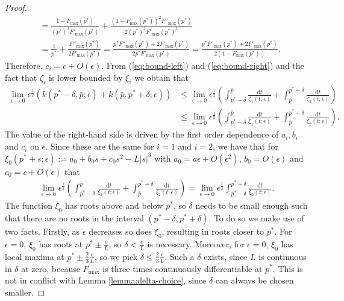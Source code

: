\documentclass[11pt,a4paper]{article}
\numberwithin{equation}{section}
\begin{document}
\begin{proof}
\begin{align*}
        &=\frac{1-F_{\max}(p^*)}{(p^*)^2F'_{\max}\left(p^*\right)}+\frac{(1-F_{\max}(p^*))^2F''_{\max}\left(p^*\right)}{2(p^*)^2F'_{\max}\left(p^*\right)^3}\\
        &=\frac{1}{p^*}+\frac{F''_{\max}\left(p^*\right)}{2F'_{\max}\left(p^*\right)}=\frac{p^*F''_{\max}(p^*)+2F'_{\max}(p^*)}{2p^*F'_{\max}(p^*)}=\frac{p^*F''_{\max}(p^*)+2F'_{\max}(p^*)}{2(1-F_{\max}(p^*))}.
    \end{align*}
    Therefore, $c_i=c+O(\epsilon)$. From (\ref{eq:bound-left}) and (\ref{eq:bound-right}) and the fact that $\zeta_i$ is lower bounded by $\xi_i$ we obtain that
    \begin{align*}
        \lim_{\epsilon\to 0}\epsilon^{\frac{1}{2}}\left(k(p^*-\delta,\bar{p};\epsilon)+k(\bar{p},p^*+\delta;\epsilon)\right)&\le\lim_{\epsilon\to 0}\epsilon^{\frac{1}{2}}\left(\int_{p^*-\delta}^{\bar{p}}\frac{\mathrm{d}t}{\zeta_1(t;\epsilon)}+\int_{\bar{p}}^{p^*+\delta}\frac{\mathrm{d}t}{\zeta_2(t;\epsilon)}\right)\\
        &\le\lim_{\epsilon\to 0}\epsilon^{\frac{1}{2}}\left(\int_{p^*-\delta}^{\bar{p}}\frac{\mathrm{d}t}{\xi_1(t;\epsilon)}+\int^{p^*+\delta}_{\bar{p}}\frac{\mathrm{d}t}{\xi_2(t;\epsilon)}\right).
    \end{align*}
    The value of the right-hand side is driven by the first order dependence of $a_i,b_i$ and $c_i$ on $\epsilon$. Since these are the same for $i=1$ and $i=2$, we have that for $\xi_0(p^*+s;\epsilon):=a_0+b_0s+c_0s^2-L|s|^3$ with $a_0=a\epsilon+O(\epsilon^2)$, $b_0=O(\epsilon)$ and $c_0=c+O(\epsilon)$ that 
    \begin{align}
        \lim_{\epsilon\to 0}\epsilon^{\frac{1}{2}}\left(\int_{p^*-\delta}^{\bar{p}}\frac{\mathrm{d}t}{\xi_1(t;\epsilon)}+\int^{p^*+\delta}_{\bar{p}}\frac{\mathrm{d}t}{\xi_2(t;\epsilon)}\right)=\lim_{\epsilon\to 0}\epsilon^{\frac{1}{2}}\int_{p^*-\delta}^{p^*+\delta}\frac{\mathrm{d}t}{\xi_0(t;\epsilon)}.\label{eq:xi-0}
    \end{align}
    The function $\xi_0$ has roots above and below $p^*$, so $\delta$ needs to be small enough such that there are no roots in the interval $(p^*-\delta,p^*+\delta)$. To do so we make use of two facts. Firstly, as $\epsilon$ decreases so does $\xi_0$, resulting in roots closer to $p^*$. For $\epsilon=0$, $\xi_0$ has roots at $p^*\pm\frac{c}{L}$, so $\delta <\frac{c}{L}$ is necessary. Moreover, for $\epsilon=0$, $\xi_0$ has local maxima at $p^*\pm\frac{2}{3}\frac{c}{L}$, so we pick $\delta\le\frac{2}{3}\frac{c}{L}$. 
    Such a $\delta$ exists, since $L$ is continuous in $\delta$ at zero, because $F_{\max}$ is three times continuously differentiable at $p^*$. This is not in conflict with Lemma \ref{lemma:delta-choice}, since $\delta$ can always be chosen smaller.
    

\end{proof}
\end{document}
